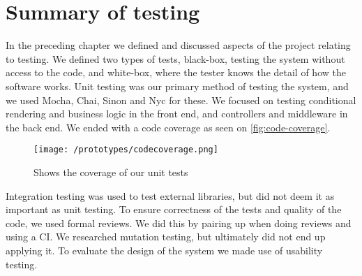 \section{Summary of testing}
In the preceding chapter we defined and discussed aspects of the project relating to testing.
We defined two types of tests, black-box, testing the system without access to the code, and white-box, where the tester knows the detail of how the software works.
Unit testing was our primary method of testing the system, and we used Mocha, Chai, Sinon and Nyc for these.
We focused on testing conditional rendering and business logic in the front end, and controllers and middleware in the back end.
We ended with a code coverage as seen on \autoref{fig:code-coverage}.
\begin{figure}[]
    \texttt{[image: /prototypes/codecoverage.png]}
     \caption{Shows the coverage of our unit tests}
     \label{fig:code-coverage}
 \end{figure}
Integration testing was used to test external libraries, but did not deem it as important as unit testing.
To ensure correctness of the tests and quality of the code, we used formal reviews.
We did this by pairing up when doing reviews and using a CI.
We researched mutation testing, but ultimately did not end up applying it.
To evaluate the design of the system we made use of usability testing.
